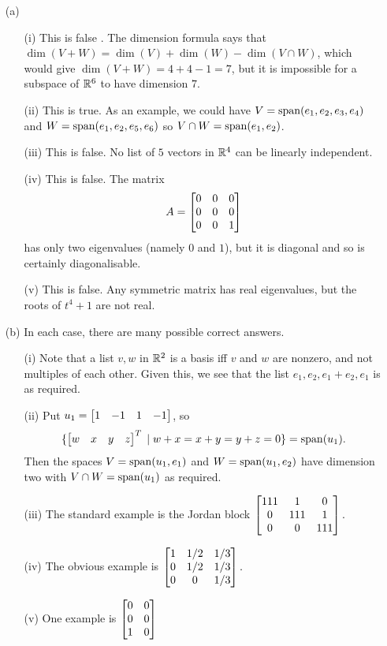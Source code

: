 \documentclass[a4paper]{article}
\begin{document}
\begin{solution}
 \begin{itemize}
  \item[(a)]
   \begin{itemize}
    \item[(i)] This is false \mk.  The dimension formula says that
     $\dim(V+W)=\dim(V)+\dim(W)-\dim(V\cap W)$, which would give
     $\dim(V+W)=4+4-1=7$, but it is impossible for a subspace of
     ${\mathbb{R}}^6$ to have dimension $7$. \mk
    \item[(ii)] This is true. \mk As an example, we could have
     $V=\operatorname{span}(e_1,e_2,e_3,e_4)$ and $W=\operatorname{span}(e_1,e_2,e_5,e_6)$ so
     $V\cap W=\operatorname{span}(e_1,e_2)$. \mk
    \item[(iii)] This is false. \mk No list of $5$ vectors in ${\mathbb{R}}^4$
     can be linearly independent. \mk
    \item[(iv)] This is false. \mk The matrix 
     \[ A = \left[\begin{matrix} 0&0&0 \\ 0&0&0 \\ 0&0&1 \end{matrix}\right] \]
     has only two eigenvalues (namely $0$ and $1$), but it is diagonal
     and so is certainly diagonalisable. \mk
    \item[(v)] This is false. \mk Any symmetric matrix has real
     eigenvalues, but the roots of $t^4+1$ are not real. \mk
   \end{itemize}
  \item[(b)] In each case, there are many possible correct answers.
   \begin{itemize}
    \item[(i)] Note that a list $v,w$ in ${\mathbb{R}}^2$ is a basis iff $v$ and
     $w$ are nonzero, and not multiples of each other.  Given this, we
     see that the list $e_1,e_2,e_1+e_2,e_1$ is as required. 
    \item[(ii)] Put $u_1=\left[\begin{matrix} 1&-1&1&-1\end{matrix}\right]$, so 
     \[ \{\left[\begin{matrix} w&x&y&z\end{matrix}\right]^T \;|\; w+x=x+y=y+z=0\} = \operatorname{span}(u_1). \]
     Then the spaces $V=\operatorname{span}(u_1,e_1)$ and $W=\operatorname{span}(u_1,e_2)$ have
     dimension two with $V\cap W=\operatorname{span}(u_1)$ as required. 
    \item[(iii)] The standard example is the Jordan block
     $\displaystyle 
       \left[\begin{matrix} 111 & 1 & 0 \\ 0 & 111 & 1 \\ 0 & 0 & 111 \end{matrix}\right].
     $   
    \item[(iv)] The obvious example is
     $\displaystyle
        \left[\begin{matrix} 1 & 1/2 & 1/3 \\ 0 & 1/2 & 1/3 \\ 0 & 0 & 1/3 \end{matrix}\right].
     $ 
    \item[(v)] One example is 
     $\displaystyle \left[\begin{matrix} 0 & 0 \\ 0 & 0 \\ 1 & 0 \end{matrix}\right] $
   \end{itemize}
 \end{itemize}
\end{solution}
\end{document}

